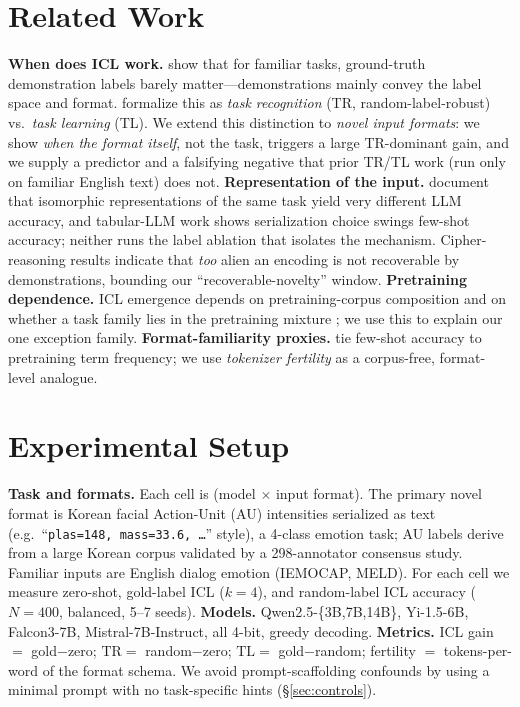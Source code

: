 \documentclass[11pt]{article}
\begin{document}
\section{Related Work}
\textbf{When does ICL work.} \citet{min2022rethinking} show that for familiar tasks,
ground-truth demonstration labels barely matter---demonstrations mainly convey the label
space and format. \citet{pan2023tr} formalize this as \emph{task recognition} (TR,
random-label-robust) vs.\ \emph{task learning} (TL). We extend this distinction to
\emph{novel input formats}: we show \emph{when the format itself}, not the task, triggers
a large TR-dominant gain, and we supply a predictor and a falsifying negative that prior
TR/TL work (run only on familiar English text) does not.
\textbf{Representation of the input.} \citet{fu2024isobench} document that isomorphic
representations of the same task yield very different LLM accuracy, and tabular-LLM work
\cite{hegselmann2023tabllm} shows serialization choice swings few-shot accuracy; neither
runs the label ablation that isolates the mechanism. Cipher-reasoning
results indicate that \emph{too} alien an encoding is not recoverable by demonstrations,
bounding our ``recoverable-novelty'' window.
\textbf{Pretraining dependence.} ICL emergence depends on pretraining-corpus composition
\cite{shin2022corpora} and on whether a task family lies in the pretraining mixture
\cite{yadlowsky2023mixtures}; we use this to explain our one exception family.
\textbf{Format-familiarity proxies.} \citet{razeghi2022impact} tie few-shot accuracy to
pretraining term frequency; we use \emph{tokenizer fertility} as a corpus-free,
format-level analogue.

\section{Experimental Setup}
\textbf{Task and formats.} Each cell is (model $\times$ input format). The primary novel
format is Korean facial Action-Unit (AU) intensities serialized as text
(e.g.\ ``\texttt{plas=148, mass=33.6, \dots}'' style), a 4-class emotion task; AU labels
derive from a large Korean corpus validated by a 298-annotator consensus study. Familiar
inputs are English dialog emotion (IEMOCAP, MELD). For each cell we measure zero-shot,
gold-label ICL ($k{=}4$), and random-label ICL accuracy ($N{=}400$, balanced, 5--7 seeds).
\textbf{Models.} Qwen2.5-\{3B,7B,14B\}, Yi-1.5-6B, Falcon3-7B, Mistral-7B-Instruct,
all 4-bit, greedy decoding.
\textbf{Metrics.} ICL gain $=$ gold$-$zero; $\mathrm{TR}=$ random$-$zero;
$\mathrm{TL}=$ gold$-$random; fertility $=$ tokens-per-word of the format schema.
We avoid prompt-scaffolding confounds by using a minimal prompt with no task-specific
hints (\S\ref{sec:controls}).
\end{document}
